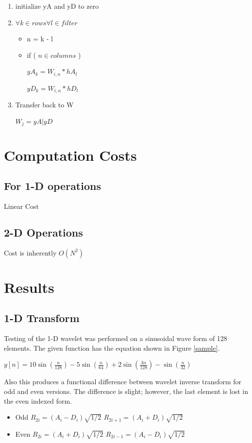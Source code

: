 \documentclass[11pt]{article}
\begin{document}
\begin{enumerate}
\item initialize yA and yD to zero
\item $\forall k \in rows \forall l \in filter$
\begin{itemize}
\item n = k - l
\item if ( $n \in columns $ )

	$yA_k = W_{i,n} * hA_l $
	
	$yD_k = W_{i,n} * hD_l $
	
	
\end{itemize}
\item Transfer back to W

	$W_j = yA|yD $
\end{enumerate}

\section{Computation Costs}
\subsection {For 1-D operations}
Linear Cost
\subsection {2-D Operations}
Cost is inherently $O(N^2)$

\newpage
\section {Results}
\subsection { 1-D Transform}
Testing of the 1-D wavelet was performed on a sinusoidal wave form of 128 elements.  The given function has the equation shown in Figure \ref{sample}.

$y[n] = 10 \sin (\frac{n}{128}) - 5 \sin (\frac{n}{64}) + 2 \sin (\frac{3n}{128}) - \sin (\frac{n}{32})$

Also this produces a functional difference between wavelet inverse transform for odd and even versions.  The difference is slight; however, the last element is lost in the even indexed form.  

\begin{itemize}
\item Odd   $R_{2i} =(A_i - D_i ) \sqrt{1/2} $
	$R_{2i+1}=(A_i + D_i ) \sqrt{1/2} $
\item Even $R_{2i} =(A_i + D_i ) \sqrt{1/2} $
	$R_{2i-1}=(A_i - D_i ) \sqrt{1/2} $
\end{itemize}
\newpage
\end{document}
